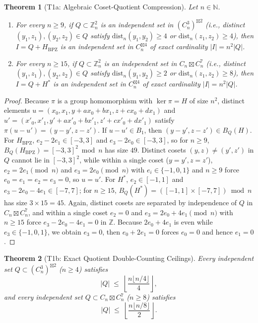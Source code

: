 \documentclass[11pt,reqno]{amsart}
\newtheorem{theorem}{Theorem}[section]
\theoremstyle{definition}
\newcommand{\Z}{\mathbb{Z}}
\newcommand{\N}{\mathbb{N}}
\newcommand{\sprod}{\boxtimes}
\newcommand{\Hbpz}{H_{\mathrm{BPZ}}}
\newcommand{\Hstar}{H^*}
\newcommand{\dist}{\mathrm{dist}_n}
\begin{document}
\begin{theorem}[T1a: Algebraic Coset-Quotient Compression]\label{thm:t1a}
Let $n \in \N$.
\begin{enumerate}[label=(\roman*),leftmargin=2.2em]
  \item For every $n \ge 9$, if $Q \subset \Z_n^2$ is an independent set in $(C_n^3)^{\sprod 2}$ (i.e., distinct $(y_1,z_1),(y_2,z_2)\in Q$ satisfy $\dist(y_1,y_2)\ge 4$ or $\dist(z_1,z_2)\ge 4$), then $I = Q + \Hbpz$ is an independent set in $C_n^{\sprod 4}$ of exact cardinality $|I| = n^2 |Q|$.
  \item For every $n \ge 15$, if $Q \subset \Z_n^2$ is an independent set in $C_n \sprod C_n^7$ (i.e., distinct $(y_1,z_1),(y_2,z_2)\in Q$ satisfy $\dist(y_1,y_2)\ge 2$ or $\dist(z_1,z_2)\ge 8$), then $I = Q + \Hstar$ is an independent set in $C_n^{\sprod 4}$ of exact cardinality $|I| = n^2 |Q|$.
\end{enumerate}
\end{theorem}

\begin{proof}
Because $\pi$ is a group homomorphism with $\ker\pi = H$ of size $n^2$, distinct elements $u=(x_0,x_1,y+a x_0+b x_1,z+c x_0+d x_1)$ and $u'=(x'_0,x'_1,y'+a x'_0+b x'_1,z'+c x'_0+d x'_1)$ satisfy $\pi(u-u')=(y-y',z-z')$. If $u - u' \in B_1$, then $(y-y',z-z') \in B_Q(H)$.
For $\Hbpz$, $e_2 - 2e_1 \in [-3,3]$ and $e_3 - 2e_0 \in [-3,3]$, so for $n \ge 9$, $B_Q(\Hbpz) = [-3,3]^2 \bmod n$ has size $49$. Distinct cosets $(y,z)\neq(y',z')$ in $Q$ cannot lie in $[-3,3]^2$, while within a single coset ($y=y',z=z'$), $e_2 = 2e_1 \pmod n$ and $e_3 = 2e_0 \pmod n$ with $e_i\in\{-1,0,1\}$ and $n \ge 9$ force $e_0=e_1=e_2=e_3=0$, so $u=u'$.
For $\Hstar$, $e_2 \in [-1,1]$ and $e_3 - 2e_0 - 4e_1 \in [-7,7]$; for $n \ge 15$, $B_Q(\Hstar) = ([-1,1]\times[-7,7])\bmod n$ has size $3 \times 15 = 45$. Again, distinct cosets are separated by independence of $Q$ in $C_n \sprod C_n^7$, and within a single coset $e_2 = 0$ and $e_3 = 2e_0 + 4e_1 \pmod n$ with $n \ge 15$ force $e_3 - 2e_0 - 4e_1 = 0$ in $\Z$. Because $2e_0 + 4e_1$ is even while $e_3\in\{-1,0,1\}$, we obtain $e_3 = 0$, then $e_0 + 2e_1 = 0$ forces $e_0=0$ and hence $e_1=0$.
\end{proof}

\begin{theorem}[T1b: Exact Quotient Double-Counting Ceilings]\label{thm:t1b}
Every independent set $Q \subset (C_n^3)^{\sprod 2}$ ($n \ge 4$) satisfies
\[
  |Q| \;\le\; \left\lfloor \frac{n \lfloor n/4 \rfloor}{4} \right\rfloor,
\]
and every independent set $Q \subset C_n \sprod C_n^7$ ($n \ge 8$) satisfies
\[
  |Q| \;\le\; \left\lfloor \frac{n \lfloor n/8 \rfloor}{2} \right\rfloor.
\]
\end{theorem}
\end{document}
